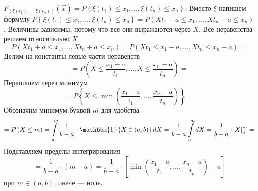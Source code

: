 $F_{ \left( \xi \left( t_1 \right), \dotsc, \xi \left( t_n \right) \right) }
  \left( \vec{x} \right) =
  P \left\{ \xi \left( t_1 \right) \leq x_1, \dotsc, \xi \left( t_n \right) \leq x_n \right\} $.
Вместо $ \xi $ напишем формулу
$P \left\{ \xi \left( t_1 \right) \leq x_1, \dotsc, \xi \left( t_n \right) \leq x_n \right\} =
  P \left( Xt_1 + a \leq x_1, \dotsc, Xt_n + a \leq x_n \right) $.
Величины зависимы, потому что все они выражаются через $X$.
Все неравенства решаем относительно $X$
$$P \left( Xt_1 + a \leq x_1, \dotsc, Xt_n + a \leq x_n \right) =
  P \left( Xt_1 \leq x_1 - a, \dotsc, Xt_n \leq x_n - a \right) =$$
Делим на константы левые части неравенств
$$= P \left( X \leq \frac{x_1 - a}{t_1}, \dotsc, X \leq \frac{x_n - a}{t_n} \right) =$$
Перепишем через минимум
$$= P \left\{
    X \leq \min \left( \frac{x_1 - a}{t_1}, \dotsc, \frac{x_n - a}{t_n} \right)
  \right\} =$$
Обозначим минимум буквой $m$ для удобства
$$= P \left( X \leq m \right) =
  \int \limits_a^m \frac{1}{b - a} \cdot \mathbbm{1} \left\{ X \in \left( a, b \right) \right\} dX =
  \frac{1}{b - a} \int \limits_a^m dX =
  \frac{1}{b - a} \cdot \left. X \right|_a^m =$$
Подставляем пределы интегрирования
$$= \frac{1}{b - a} \cdot \left( m - a \right) =
  \frac{1}{b - a} \cdot
  \left[ \min \left( \frac{x_1 - a}{t_1}, \dotsc, \frac{x_n - a}{t_n} \right) - a \right] $$
при $m \in \left( a, b \right) $, иначе --- ноль.
